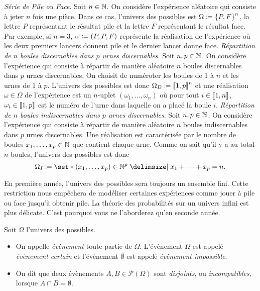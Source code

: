 \documentclass{magnolia}
\begin{document}
\begin{exemples}
\exemple \emph{Série de Pile ou Face}. Soit $n\in\mathbb{N}$. On considère l'expérience aléatoire
  qui consiste à jeter $n$ fois une pièce. Dans ce cas, l'univers des possibles est
  $\Omega\coloneqq\left\{P,F\right\}^n$, la lettre $P$ représentant le résultat pile et la lettre
  $F$ représentant le résultat face. Par exemple, si $n=3$,
  $\omega\coloneqq(P,P,F)$ représente la réalisation de l'expérience où les deux premiers
   lancers donnent pile et le dernier lancer donne face.
\exemple \emph{Répartition de $n$ boules discernables dans $p$ urnes discernables}. Soit
  $n,p\in\mathbb{N}$. On considère l'expérience qui consiste à répartir de manière aléatoire $n$
  boules discernables dans $p$ urnes discernables. On choisit de numéroter les boules de
  1 à $n$ et les urnes de $1$ à $p$. L'univers des possibles est donc
  $\Omega_D\coloneqq\left\llbracket 1,p\right\rrbracket^n$ et une réalisation $\omega\in\Omega$ de l'expérience
   est un $n$-uplet $(\omega_1,\ldots,\omega_n)$ où pour tout $i\in\left\llbracket 1,n\right\rrbracket$,
  $\omega_i\in\left\llbracket 1,p\right\rrbracket$ est le numéro de l'urne dans laquelle on a placé la boule $i$.
\exemple
  \emph{Répartition de $n$ boules indiscernables dans $p$ urnes discernables}. Soit
  $n,p\in\mathbb{N}$. On considère l'expérience qui consiste à répartir de manière aléatoire
  $n$ boules indiscernables dans $p$ urnes discernables. Une réalisation est
  caractérisée par le nombre de boules $x_1,\ldots,x_p\in\mathbb{N}$ que contient chaque urne.
  Comme on sait qu'il y a au total $n$ boules, l'univers des possibles est donc
  \[\Omega_I\defeq\enstq{(x_1,\ldots,x_p)\in\N^p}{x_1+\cdots+x_p=n}.\]
\end{exemples}

\begin{remarqueUnique}
\remarque En première année, l'univers des possibles sera toujours un ensemble fini. Cette
  restriction nous empêchera de modéliser certaines expériences comme jouer à pile ou face
  jusqu'à obtenir pile. La théorie des probabilités sur un univers infini est
  plus délicate. C'est pourquoi vous ne l'aborderez qu'en seconde année.
\end{remarqueUnique}

\begin{definition}
Soit $\Omega$ l'univers des possibles.
\begin{itemize}
\item On appelle \emph{évènement} toute partie de $\Omega$. L'évènement $\Omega$ est appelé
  \emph{évènement certain} et l'évènement $\emptyset$ est appelé \emph{évènement impossible}.
\item On dit que deux évènements $A,B\in\mathcal{P}(\Omega)$ sont
  \emph{disjoints}, ou \emph{incompatibles}, lorsque
  $A\cap B=\emptyset$.
\end{itemize}
\end{definition}
\end{document}
